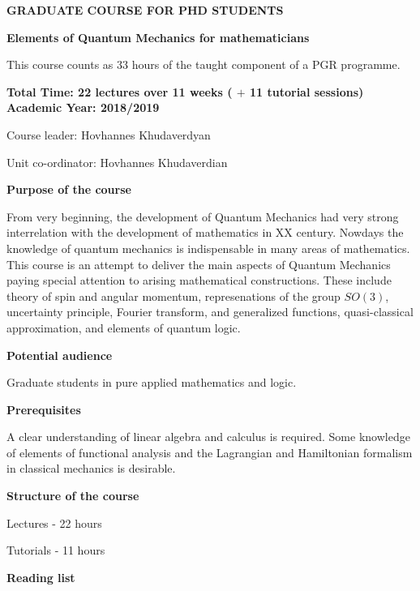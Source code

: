 \documentclass[12pt]{article}
\begin{document}
\centerline {\bf  GRADUATE COURSE FOR PHD STUDENTS}

\bigskip

\centerline 
{\bf Elements of Quantum Mechanics for mathematicians}

\smallskip

This course counts as 33 hours of the taught component 
of a PGR programme.

{\bf Total Time: 22 lectures over 11 weeks
 ( $+$ 11 tutorial sessions) Academic Year: 2018/2019

Course leader: Hovhannes Khudaverdyan



Unit co-ordinator: Hovhannes Khudaverdian  



}

\medskip

{\bf Purpose of the course}

 

From  very beginning, the development of
Quantum Mechanics  had very strong interrelation with the
development of mathematics in XX century. 
 Nowdays the knowledge of quantum mechanics
is indispensable in many areas of mathematics.
This course is an attempt to 
deliver the main aspects of  Quantum Mechanics
paying special attention
to   arising mathematical constructions. 
These include theory of spin and angular momentum,  
represenations of the group $SO(3)$, 
uncertainty principle, Fourier transform, 
and generalized functions, 
quasi-classical approximation, and elements of quantum logic.   

 
\medskip
 
{\bf Potential audience}

Graduate students in pure applied mathematics and logic.


\medskip


{\bf  Prerequisites}

A clear understanding of linear algebra 
and calculus is required. 
Some knowledge of elements of functional analysis
 and the Lagrangian and Hamiltonian formalism 
in classical mechanics
is desirable.

\bigskip

{\bf Structure of the course}


Lectures - 22 hours 

Tutorials - 11 hours 

\medskip

{\bf Reading list}
\end{document}
